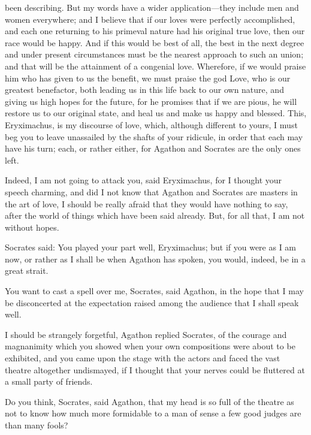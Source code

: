 \documentclass[11pt,letter]{article}
\begin{document}
been describing. But my words have a wider application—they include men and women everywhere; and I believe that if our loves were perfectly accomplished, and each one returning to his primeval nature had his original true love, then our race would be happy. And if this would be best of all, the best in the next degree and under present circumstances must be the nearest approach to such an union; and that will be the attainment of a congenial love. Wherefore, if we would praise him who has given to us the benefit, we must praise the god Love, who is our greatest benefactor, both leading us in this life back to our own nature, and giving us high hopes for the future, for he promises that if we are pious, he will restore us to our original state, and heal us and make us happy and blessed. This, Eryximachus, is my discourse of love, which, although different to yours, I must beg you to leave unassailed by the shafts of your ridicule, in order that each may have his turn; each, or rather either, for Agathon and Socrates are the only ones left.

\par  Indeed, I am not going to attack you, said Eryximachus, for I thought your speech charming, and did I not know that Agathon and Socrates are masters in the art of love, I should be really afraid that they would have nothing to say, after the world of things which have been said already. But, for all that, I am not without hopes.

\par  Socrates said: You played your part well, Eryximachus; but if you were as I am now, or rather as I shall be when Agathon has spoken, you would, indeed, be in a great strait.

\par  You want to cast a spell over me, Socrates, said Agathon, in the hope that I may be disconcerted at the expectation raised among the audience that I shall speak well.

\par  I should be strangely forgetful, Agathon replied Socrates, of the courage and magnanimity which you showed when your own compositions were about to be exhibited, and you came upon the stage with the actors and faced the vast theatre altogether undismayed, if I thought that your nerves could be fluttered at a small party of friends.

\par  Do you think, Socrates, said Agathon, that my head is so full of the theatre as not to know how much more formidable to a man of sense a few good judges are than many fools?
\end{document}
